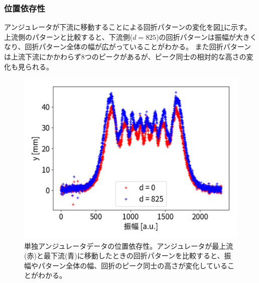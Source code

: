 \documentclass[a4paper,11pt,uplatex]{jsbook}
\begin{document}
\subsubsection{位置依存性}
アンジュレータが下流に移動することによる回折パターンの変化を図\ref{DCposdep}に示す。上流側のパターンと比較すると、下流側($d= 825$)の回折パターンは振幅が大きくなり、回折パターン全体の幅が広がっていることがわかる。
また回折パターンは上流下流にかかわらず8つのピークがあるが、ピーク同士の相対的な高さの変化も見られる。
\begin{figure}
  \centering
  \includegraphics[width=0.8\linewidth]{image/4-DCposdep.png}
  \caption[アンジュレータ位置依存性]{単独アンジュレータデータの位置依存性。アンジュレータが最上流(赤)と最下流(青)に移動したときの回折パターンを比較すると、振幅やパターン全体の幅、回折のピーク同士の高さが変化していることがわかる。}\label{DCposdep}
\end{figure}
\end{document}
